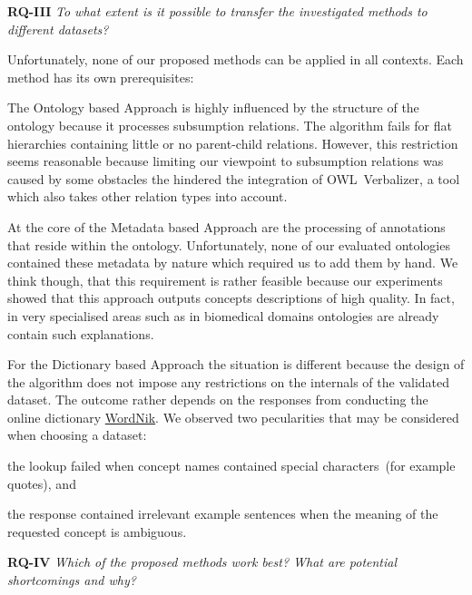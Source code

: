 \textbf{RQ-III} \emph{To what extent is it possible to transfer the investigated methods to different datasets?}

Unfortunately, none of our proposed methods can be applied in all contexts. Each method has its own prerequisites:

The Ontology based Approach is highly influenced by the structure of the ontology because it processes subsumption relations. The algorithm fails 
for flat hierarchies containing little or no parent-child relations. However, this restriction seems reasonable because limiting our viewpoint to subsumption relations was caused by some obstacles the hindered the integration of OWL~Verbalizer, a tool which also takes other relation types into account. 

At the core of the Metadata based Approach are the processing of annotations that reside within the ontology. Unfortunately, none of our evaluated ontologies contained these metadata by nature which required us to add them by hand. We think though, that this requirement is rather feasible because our experiments showed that this approach outputs concepts descriptions of high quality.  In fact, in very specialised areas such as in biomedical domains ontologies are already contain such explanations. 

For the Dictionary based Approach the situation is different because the design of the algorithm does not impose any restrictions on the internals of the validated dataset. The outcome rather depends on the responses from conducting the online dictionary \hyperref[sec:wordnik]{WordNik}. We observed two pecularities that may be considered when choosing a dataset:
\begin{inparaenum}[i)]
	\item the lookup failed when concept names contained special characters~(for example quotes), and
	\item the response contained irrelevant example sentences when the meaning of the requested concept is ambiguous.
\end{inparaenum}


\textbf{RQ-IV} \emph{Which of the proposed methods work best? What are potential shortcomings and why?} 

